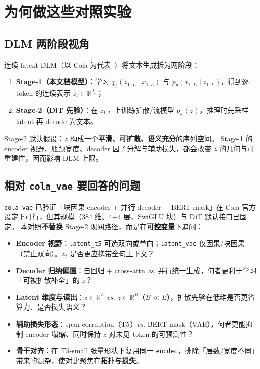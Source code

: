 \documentclass[UTF8,a4paper,11pt]{ctexart}
\begin{document}
\section{为何做这些对照实验}
\label{sec:why}

\subsection{DLM 两阶段视角}

连续 latent DLM（以 Cola 为代表~\cite{cola2026dlm}）将文本生成拆为两阶段：
\begin{enumerate}
  \item \textbf{Stage-1（本文档模型）}：学习 $q_\phi(z_{1:L}\mid x_{1:L})$ 与 $p_\theta(x_{1:L}\mid z_{1:L})$，得到逐 token 的连续表示 $z_t\in\mathbb{R}^{d_z}$；
  \item \textbf{Stage-2（DiT 先验）}：在 $z_{1:L}$ 上训练扩散/流模型 $p_\psi(z)$，推理时先采样 latent 再 decode 为文本。
\end{enumerate}
Stage-2 默认假设：$z$ 构成一个\textbf{平滑、可扩散、语义充分}的序列空间。
Stage-1 的 encoder 视野、瓶颈宽度、decoder 因子分解与辅助损失，都会改变 $z$ 的几何与可重建性，因而影响 DLM 上限。

\subsection{相对 \texttt{cola\_vae} 要回答的问题}

\texttt{cola\_vae} 已验证「块因果 encoder + 并行 decoder + BERT-mask」在 Cola 官方设定下可行，但其规模（384 维、4+4 层、SwiGLU 块）与 DiT 默认接口已固定。
本对照\textbf{不替换} Stage-2 现网路径，而是在\textbf{可控变量}下追问：

\begin{itemize}
  \item \textbf{Encoder 视野}：\texttt{latent\_t5} 可选双向或单向；\texttt{latent\_vae} 仅因果/块因果（禁止双向）。$z_t$ 是否更应携带全句上下文？
  \item \textbf{Decoder 归纳偏置}：自回归 + cross-attn \emph{vs.} 并行统一生成，何者更利于学习「可被扩散补全」的 $z$？
  \item \textbf{Latent 维度与读出}：$z\in\mathbb{R}^E$ \emph{vs.} $z\in\mathbb{R}^B$（$B{\ll}E$），扩散先验在低维是否更省算力、是否损失语义？
  \item \textbf{辅助损失形态}：span corruption（T5）\emph{vs.} BERT-mask（VAE），何者更能抑制 encoder 塌缩、同时保持 $z$ 对未见 token 的可预测性？
  \item \textbf{骨干对齐}：在 T5-small 张量形状下复用同一 \texttt{encdec}，排除「层数/宽度不同」带来的混杂，使对比聚焦在\textbf{拓扑与损失}。
\end{itemize}
\end{document}
